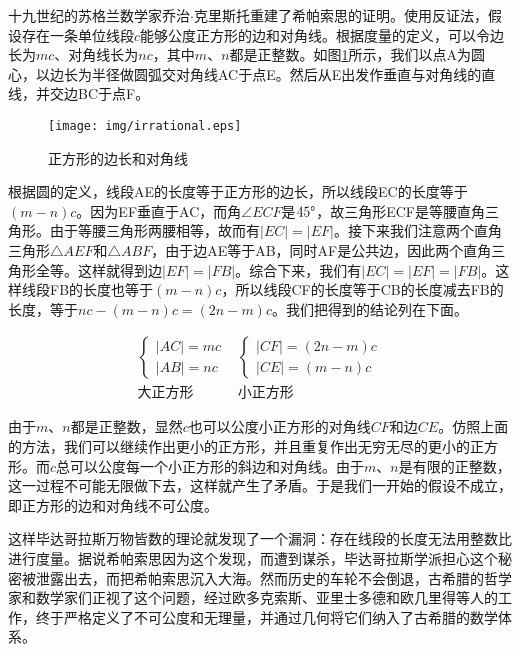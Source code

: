 \documentclass[UTF8]{article}
\begin{document}
十九世纪的苏格兰数学家乔治$\cdot$克里斯托重建了希帕索思的证明。使用反证法，假设存在一条单位线段$c$能够公度正方形的边和对角线。根据度量的定义，可以令边长为$mc$、对角线长为$nc$，其中$m$、$n$都是正整数。如图\ref{fig:irrational}所示，我们以点A为圆心，以边长为半径做圆弧交对角线AC于点E。然后从E出发作垂直与对角线的直线，并交边BC于点F。

\begin{figure}[htbp]
 \centering
 \texttt{[image: img/irrational.eps]}
 \caption{正方形的边长和对角线}
 \label{fig:irrational}
\end{figure}

根据圆的定义，线段AE的长度等于正方形的边长，所以线段EC的长度等于$(m - n)c$。因为EF垂直于AC，而角$\angle ECF$是$45\degree$，故三角形ECF是等腰直角三角形。由于等腰三角形两腰相等，故而有$|EC| = |EF|$。接下来我们注意两个直角三角形$\triangle AEF$和$\triangle ABF$，由于边AE等于AB，同时AF是公共边，因此两个直角三角形全等。这样就得到边$|EF| = |FB|$。综合下来，我们有$|EC| = |EF| = |FB|$。这样线段FB的长度也等于$(m - n)c$，所以线段CF的长度等于CB的长度减去FB的长度，等于$nc - (m - n)c = (2n - m)c$。我们把得到的结论列在下面。

\[
\begin{array}{c|c}
\begin{cases}
|AC| = mc \\
|AB| = nc
\end{cases} &
\begin{cases}
|CF| = (2n - m)c \\
|CE| = (m - n)c
\end{cases} \\[4ex]
\text{大正方形} & \text{小正方形}
\end{array}
\]

由于$m$、$n$都是正整数，显然$c$也可以公度小正方形的对角线$CF$和边$CE$。仿照上面的方法，我们可以继续作出更小的正方形，并且重复作出无穷无尽的更小的正方形。而$c$总可以公度每一个小正方形的斜边和对角线。由于$m$、$n$是有限的正整数，这一过程不可能无限做下去，这样就产生了矛盾。于是我们一开始的假设不成立，即正方形的边和对角线不可公度。

这样毕达哥拉斯万物皆数的理论就发现了一个漏洞：存在线段的长度无法用整数比进行度量。据说希帕索思因为这个发现，而遭到谋杀，毕达哥拉斯学派担心这个秘密被泄露出去，而把希帕索思沉入大海。然而历史的车轮不会倒退，古希腊的哲学家和数学家们正视了这个问题，经过欧多克索斯、亚里士多德和欧几里得等人的工作，终于严格定义了不可公度和无理量，并通过几何将它们纳入了古希腊的数学体系。
\end{document}
